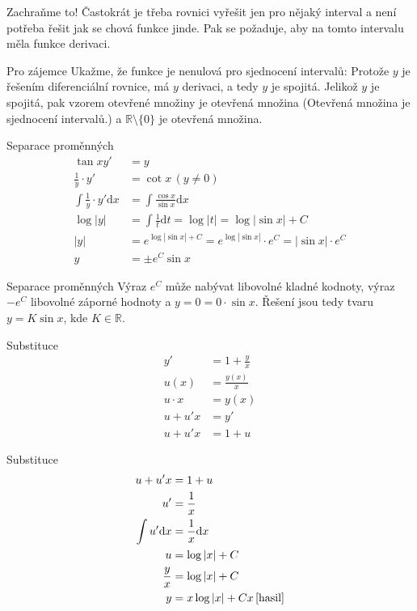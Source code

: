 \documentclass{beamer}
\theoremstyle{definition}
\theoremstyle{example}
\def\R{\mathbb{R}}
\def\d{\mathrm{d}}
\begin{document}
\begin{frame}{Zachraňme to!}
	Častokrát je třeba rovnici vyřešit jen pro nějaký interval a není potřeba řešit jak se chová funkce jinde. Pak se požaduje, aby na tomto intervalu měla funkce derivaci. 
	\begin{block}{Pro zájemce}
		Ukažme, že funkce je nenulová pro sjednocení intervalů: Protože $y$ je řešením diferenciální rovnice, má $y$ derivaci, a tedy $y$ je spojitá. Jelikož $y$ je spojitá, pak vzorem otevřené množiny je otevřená množina (Otevřená množina je sjednocení intervalů.) a $\R \setminus \{0\}$ je otevřená množina.
	\end{block}

\end{frame}

\begin{frame}{Separace proměnných}
	\begin{align*}
		\tan x y' &= y\\
		\frac{1}{y}\cdot y' &= \cot x \, (y \neq 0)\\
		\int \frac{1}{y}\cdot y' \d x &= \int \frac{\cos x}{\sin x} \d x\\
		\log |y| &= \int \frac{1}{t} \d t = \log |t| = \log |\sin x| + C\\
		|y| &= e^{\log |\sin x| + C} = e^{\log |\sin x|} \cdot e^C = |\sin x| \cdot e^C\\
		y &= \pm e^C \sin x 
	\end{align*}
\end{frame}

\begin{frame}{Separace proměnných}
	Výraz $e^C$ může nabývat libovolné kladné kodnoty, výraz $-e^C$ libovolné záporné hodnoty a $y = 0 = 0 \cdot \sin x$. Řešení jsou tedy tvaru $y = K\sin x$, kde $K \in \R$.
\end{frame}

\begin{frame}{Substituce}
	\begin{align*}
		y' &= 1 + \frac{y}{x}\\
		u(x) &= \frac{y(x)}{x}\\
		u\cdot x &= y(x)\\
		u + u'x &= y'\\
		u + u'x &= 1 + u
	\end{align*}
\end{frame}

\begin{frame}{Substituce}
	\begin{align*}
		u + u'x &= 1 + u\\
		u' &= \frac{1}{x}\\
		\int u' \d x &= \frac{1}{x} \d x\\
		u &= \log |x| + C\\
		\frac{y}{x} &= \log |x| + C\\
		y &= x \log |x| + Cx\, \text{\cite{hasil}}
	\end{align*}
\end{frame}
\end{document}
